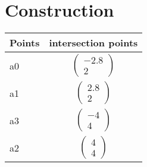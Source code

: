 \documentclass[journal,10pt,twocolumn]{article}
\newcommand{\myvec}[1]{\ensuremath{\begin{pmatrix}#1\end{pmatrix}}}
\begin{document}
\section*{\large Construction}

{
\setlength\extrarowheight{5pt}
\begin{tabular}{|l|c|}
    \hline 
    \textbf{Points} & \textbf{intersection points} \\ \hline
	a0 & $\myvec{
   -2.8\\
   2
   } $ \\\hline
	a1 & $\myvec{
   2.8\\
   2
   } $ \\\hline
    
	a3 & $\myvec{
   -4\\
   4
   } $ \\\hline
	a2 & $\myvec{
   4\\
   4
   } $ \\\hline
      
      \end{tabular}
}
\end{document}
